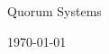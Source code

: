 \documentclass[12pt]{article}
\begin{document}
\begin{center}
  {\Large Quorum Systems}

  \today{}
\end{center}

{}



\end{document}
